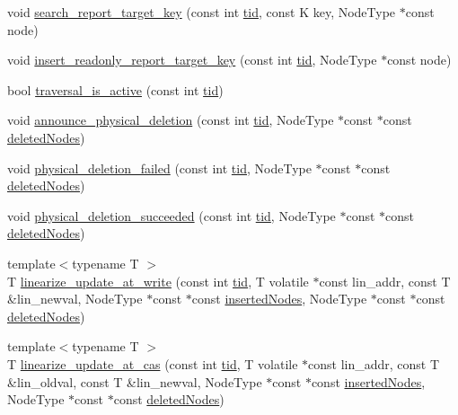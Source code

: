 \begin{DoxyCompactItemize}
\item 
void \hyperlink{classRQProvider_a716d3f717f43a9e382e088cb3b18e388}{search\+\_\+report\+\_\+target\+\_\+key} (const int \hyperlink{microbench_2main_8cpp_a9ca9869868fe7e7a38a921cc7de4103f}{tid}, const K key, Node\+Type $\ast$const node)
\item 
void \hyperlink{classRQProvider_a35662316afad25dc2d873fcc8719651e}{insert\+\_\+readonly\+\_\+report\+\_\+target\+\_\+key} (const int \hyperlink{microbench_2main_8cpp_a9ca9869868fe7e7a38a921cc7de4103f}{tid}, Node\+Type $\ast$const node)
\item 
bool \hyperlink{classRQProvider_a2b3447faaadd49584769001cfdd4f564}{traversal\+\_\+is\+\_\+active} (const int \hyperlink{microbench_2main_8cpp_a9ca9869868fe7e7a38a921cc7de4103f}{tid})
\item 
void \hyperlink{classRQProvider_a29337e6766144d1c1a9aa752fe73fabf}{announce\+\_\+physical\+\_\+deletion} (const int \hyperlink{microbench_2main_8cpp_a9ca9869868fe7e7a38a921cc7de4103f}{tid}, Node\+Type $\ast$const $\ast$const \hyperlink{scxrecord_8h_ae536bce1bb8c0fffd7a3053f7d258f1e}{deleted\+Nodes})
\item 
void \hyperlink{classRQProvider_a1fb29a074556e0431ed22f2bee394c22}{physical\+\_\+deletion\+\_\+failed} (const int \hyperlink{microbench_2main_8cpp_a9ca9869868fe7e7a38a921cc7de4103f}{tid}, Node\+Type $\ast$const $\ast$const \hyperlink{scxrecord_8h_ae536bce1bb8c0fffd7a3053f7d258f1e}{deleted\+Nodes})
\item 
void \hyperlink{classRQProvider_a1bcce8dc80c1661b549a5ec6f9ee6d15}{physical\+\_\+deletion\+\_\+succeeded} (const int \hyperlink{microbench_2main_8cpp_a9ca9869868fe7e7a38a921cc7de4103f}{tid}, Node\+Type $\ast$const $\ast$const \hyperlink{scxrecord_8h_ae536bce1bb8c0fffd7a3053f7d258f1e}{deleted\+Nodes})
\item 
{\footnotesize template$<$typename T $>$ }\\T \hyperlink{classRQProvider_a632161f99e9c5792c70340e621ed22fd}{linearize\+\_\+update\+\_\+at\+\_\+write} (const int \hyperlink{microbench_2main_8cpp_a9ca9869868fe7e7a38a921cc7de4103f}{tid}, T volatile $\ast$const lin\+\_\+addr, const T \&lin\+\_\+newval, Node\+Type $\ast$const $\ast$const \hyperlink{scxrecord_8h_a0f26579d4b35e2dad20ee190a7986d08}{inserted\+Nodes}, Node\+Type $\ast$const $\ast$const \hyperlink{scxrecord_8h_ae536bce1bb8c0fffd7a3053f7d258f1e}{deleted\+Nodes})
\item 
{\footnotesize template$<$typename T $>$ }\\T \hyperlink{classRQProvider_a234b9ee35646cdff3d751df16424a57e}{linearize\+\_\+update\+\_\+at\+\_\+cas} (const int \hyperlink{microbench_2main_8cpp_a9ca9869868fe7e7a38a921cc7de4103f}{tid}, T volatile $\ast$const lin\+\_\+addr, const T \&lin\+\_\+oldval, const T \&lin\+\_\+newval, Node\+Type $\ast$const $\ast$const \hyperlink{scxrecord_8h_a0f26579d4b35e2dad20ee190a7986d08}{inserted\+Nodes}, Node\+Type $\ast$const $\ast$const \hyperlink{scxrecord_8h_ae536bce1bb8c0fffd7a3053f7d258f1e}{deleted\+Nodes})

\end{DoxyCompactItemize}
